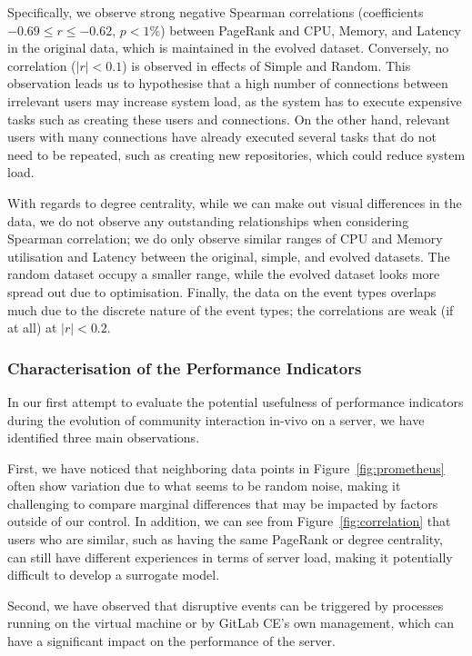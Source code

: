 \documentclass[dvipsnames,format=sigconf,anonymous=False,review=false, balance=false]{acmart}
\begin{document}
Specifically, we observe strong negative Spearman correlations (coefficients $-0.69 \leq r \leq -0.62 $, $p<1\%$) between PageRank and CPU, Memory, and Latency in the original data, which is maintained in the evolved dataset. Conversely, no correlation ($|r|<0.1$) is observed in effects of Simple and Random. This observation leads us to hypothesise that a high number of connections between irrelevant users may increase system load, as the system has to execute expensive tasks such as creating these users and connections. On the other hand, relevant users with many connections have already executed several tasks that do not need to be repeated, such as creating new repositories, which could reduce system load.

With regards to degree centrality, while we can make out visual differences in the data, we do not observe any outstanding relationships when considering Spearman correlation; we do only observe similar ranges of CPU and Memory utilisation and Latency between the original, simple, and evolved datasets. The random dataset occupy a smaller range, while the evolved dataset looks more spread out due to optimisation. Finally, the data on the event types overlaps much due to the discrete nature of the event types; the correlations are weak (if at all) at $|r|<0.2$. 

\subsubsection{Characterisation of the Performance Indicators}

In our first attempt to evaluate the potential usefulness of performance indicators during the evolution of community interaction in-vivo on a server, we have identified three main observations. 

First, we have noticed that neighboring data points in Figure~\ref{fig:prometheus} often show variation due to what seems to be random noise, making it challenging to compare marginal differences that may be impacted by factors outside of our control. In addition, we can see from Figure~\ref{fig:correlation} that users who are similar, such as having the same PageRank or degree centrality, can still have different experiences in terms of server load, making it potentially difficult to develop a surrogate model.

Second, we have observed that disruptive events can be triggered by processes running on the virtual machine or by GitLab CE's own management, which can have a significant impact on the performance of the server.
\end{document}

